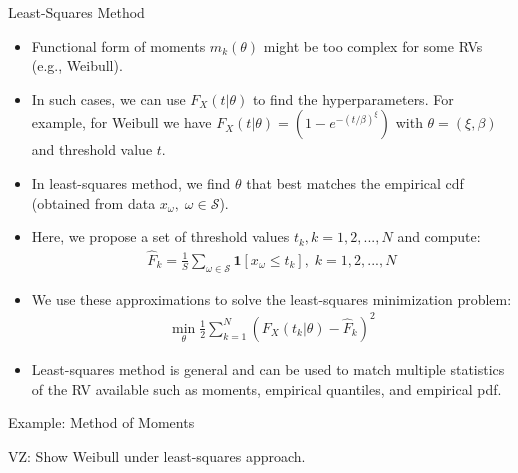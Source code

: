 \documentclass[9pt]{beamer}
\begin{document}
%
\begin{frame}{Least-Squares Method}

\begin{itemize}

\item Functional form of moments $m_k(\theta)$ might be too complex for some RVs (e.g., Weibull).

\item In such cases, we can use $F_X(t|\theta)$ to find the hyperparameters. For example, for Weibull we have $F_X(t|\theta)=(1-e^{-(t/\beta)^\xi})$ with $\theta=(\xi,\beta)$ and threshold value $t$. 

\item In least-squares method, we find $\theta$ that best matches the empirical cdf (obtained from data $x_\omega,\; \omega \in \mathcal{S}$). 

\item Here, we propose a set of threshold values $t_k, k=1,2,...,N$ and compute:
\begin{align*}
\hat{F}_k=\frac{1}{S}\sum_{\omega \in \mathcal{S}}\mathbf{1}[x_\omega\leq t_k],\; k=1,2,...,N
\end{align*}

\item  We use these approximations to solve the least-squares minimization problem:
\begin{align*}
\min_\theta \frac{1}{2}\sum_{k=1}^N(F_X(t_k|\theta)-\hat{F}_k)^2
\end{align*}

\item Least-squares method is general and can be used to match multiple statistics of the RV available such as moments, empirical quantiles, and empirical pdf. 

\end{itemize}

\end{frame}


%
\begin{frame}{Example: Method of Moments}

\begin{block}{}
{\color{red} VZ:  Show Weibull under least-squares approach.}
\end{block}

\end{frame}
\end{document}
